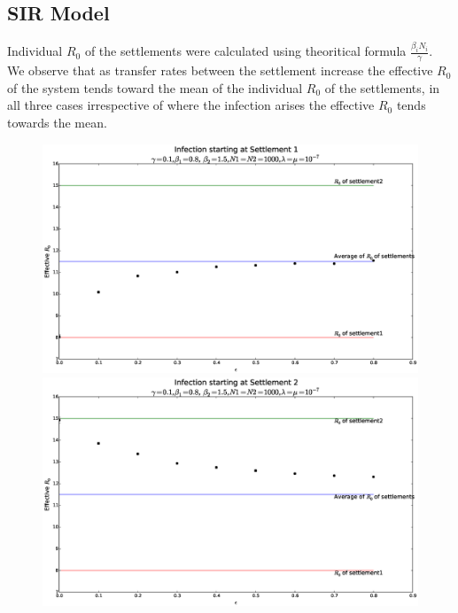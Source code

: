 \documentclass{article}
\begin{document}
\subsection{SIR Model}
Individual $R_{0}$ of the settlements were calculated using
theoritical formula $\frac{\beta_{i}N_{i}}{\gamma}$. We observe that
as transfer rates between the settlement increase the effective
$R_{0}$ of the system tends toward the mean of the individual $R_{0}$
of the settlements, in all three cases irrespective of where the
infection arises the effective $R_{0}$ tends towards the mean.
\begin{figure}[H]
  \hspace*{-2cm}
  \includegraphics[scale=0.4]{Figures_Tables/sir_1inf.eps}
  \hspace*{-2cm} 
  \includegraphics[scale=0.4]{Figures_Tables/sir_2inf.eps}
\end{figure}
\end{document}
